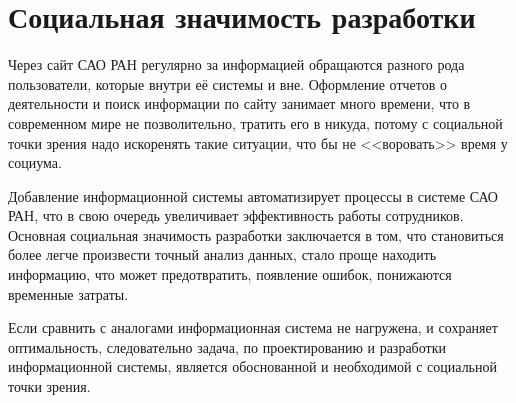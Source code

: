 \section{Социальная значимость разработки}
Через сайт САО РАН регулярно за информацией обращаются разного рода пользователи, которые внутри её системы и вне. Оформление отчетов о деятельности и поиск информации по сайту занимает много времени, что в современном мире не позволительно, тратить его в никуда, потому с социальной точки зрения надо искоренять такие ситуации, что бы не <<воровать>> время у социума.   

Добавление информационной системы автоматизирует процессы в системе САО РАН, что в свою очередь увеличивает эффективность работы сотрудников. Основная социальная значимость разработки заключается в том, что становиться более легче произвести точный анализ данных, стало проще находить информацию, что может предотвратить, появление ошибок, понижаются временные затраты.

Если сравнить с аналогами информационная система не нагружена, и сохраняет оптимальность, следовательно задача, по проектированию и разработки информационной системы, является обоснованной и необходимой с социальной точки зрения.  

\pagebreak